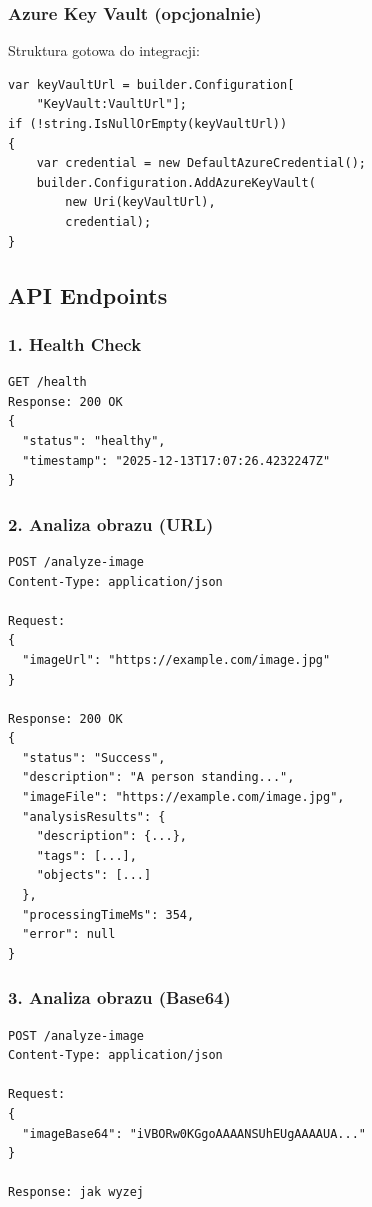 \documentclass[twoside]{article}
\begin{document}
\subsubsection{Azure Key Vault (opcjonalnie)}

Struktura gotowa do integracji:

\begin{lstlisting}
var keyVaultUrl = builder.Configuration[
    "KeyVault:VaultUrl"];
if (!string.IsNullOrEmpty(keyVaultUrl))
{
    var credential = new DefaultAzureCredential();
    builder.Configuration.AddAzureKeyVault(
        new Uri(keyVaultUrl),
        credential);
}
\end{lstlisting}

\subsection{API Endpoints}

\subsubsection{1. Health Check}

\begin{lstlisting}
GET /health
Response: 200 OK
{
  "status": "healthy",
  "timestamp": "2025-12-13T17:07:26.4232247Z"
}
\end{lstlisting}

\subsubsection{2. Analiza obrazu (URL)}

\begin{lstlisting}
POST /analyze-image
Content-Type: application/json

Request:
{
  "imageUrl": "https://example.com/image.jpg"
}

Response: 200 OK
{
  "status": "Success",
  "description": "A person standing...",
  "imageFile": "https://example.com/image.jpg",
  "analysisResults": {
    "description": {...},
    "tags": [...],
    "objects": [...]
  },
  "processingTimeMs": 354,
  "error": null
}
\end{lstlisting}

\subsubsection{3. Analiza obrazu (Base64)}

\begin{lstlisting}
POST /analyze-image
Content-Type: application/json

Request:
{
  "imageBase64": "iVBORw0KGgoAAAANSUhEUgAAAAUA..."
}

Response: jak wyzej
\end{lstlisting}
\end{document}
